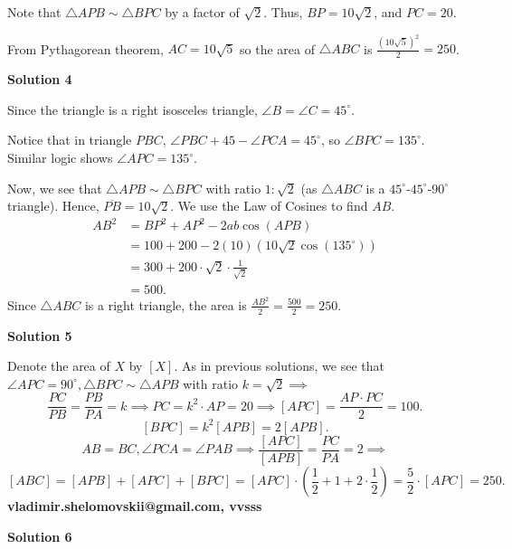 \begin{enumerate}
 Note that $\triangle APB \sim \triangle BPC$ by a factor of $\sqrt{2}$. Thus, $BP = 10\sqrt{2}$, and $PC = 20$.

 From Pythagorean theorem, $AC=10\sqrt{5}$ so the area of $\triangle ABC$ is $\frac{(10\sqrt{5})^2}{2}=\boxed{250}$.

 



\textbf{Solution 4}

Since the triangle is a right isosceles triangle, $\angle B = \angle C = 45^\circ$.

 Notice that in triangle $PBC$, $\angle PBC + 45-\angle PCA = 45^\circ$, so $\angle BPC = 135^\circ$. Similar logic shows $\angle APC = 135^\circ$.

 Now, we see that $\triangle APB \sim \triangle BPC$ with ratio $1:\sqrt{2}$ (as $\triangle ABC$ is a $45^\circ$-$45^\circ$-$90^\circ$ triangle). Hence, $\overline{PB}=10\sqrt{2}$. We use the Law of Cosines to find $AB$.
 \begin{align*} AB^2&=BP^2+AP^2-2ab\cos(APB) \\ &=100+200-2(10)(10\sqrt{2}\cos(135^\circ)) \\ &=300+200\cdot\sqrt{2}\cdot\frac{1}{\sqrt{2}} \\ &=500. \end{align*}
Since $\triangle ABC$ is a right triangle, the area is $\frac{AB^2}{2}=\frac{500}{2}=\boxed{250}$.

 



\textbf{Solution 5}

Denote the area of $X$ by $[X].$ As in previous solutions, we see that $\angle APC = 90 ^\circ, \triangle BPC \sim \triangle APB$ with ratio $k = \sqrt{2}\implies$ 
 \[\frac {PC}{PB} = \frac {PB}{PA} = k \implies PC = k^2 \cdot AP = 20 \implies [APC] = \frac {AP \cdot PC}{2} = 100.\]
 \[[BPC] = k^2 [APB] = 2 [APB].\]
 \[AB = BC, \angle PCA = \angle PAB \implies \frac {[APC]}{[APB]} = \frac {PC}{PA} = 2 \implies\] 
 \[[ABC] = [APB] + [APC] + [BPC] = [APC] \cdot (\frac {1}{2} + 1 + 2 \cdot \frac {1}{2}) = \frac {5}{2} \cdot  [APC] = \boxed{250}.\]\textbf{vladimir.shelomovskii@gmail.com, vvsss}

 



\textbf{Solution 6}


\end{enumerate}
